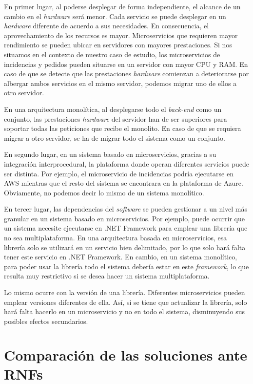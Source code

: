 \documentclass[11pt,spanish,listoffigures]{tfgetsinf}
\begin{document}
En primer lugar, al poderse desplegar de forma independiente, el alcance de un cambio en el \textit{hardware} será menor. Cada servicio se puede desplegar en un \textit{hardware} diferente de acuerdo a sus necesidades. En consecuencia, el aprovechamiento de los recursos es mayor. Microservicios que requieren mayor rendimiento se pueden ubicar en servidores con mayores prestaciones. Si nos situamos en el contexto de nuestro caso de estudio, los microservicios de incidencias y pedidos pueden situarse en un servidor con mayor CPU y RAM. En caso de que se detecte que las prestaciones \textit{hardware} comienzan a deteriorarse por albergar ambos servicios en el mismo servidor, podemos migrar uno de ellos a otro servidor. 

En una arquitectura monolítica, al desplegarse todo el \textit{back-end} como un conjunto, las prestaciones \textit{hardware} del servidor han de ser superiores para soportar todas las peticiones que recibe el monolito. En caso de que se requiera migrar a otro servidor, se ha de migrar todo el sistema como un conjunto.

En segundo lugar, en un sistema basado en microservicios, gracias a su integración interprocedural, la plataforma donde operan diferentes servicios puede ser distinta. Por ejemplo, el microservicio de incidencias podría ejecutarse en AWS mientras que el resto del sistema se encontrara en la plataforma de Azure. Obviamente, no podemos decir lo mismo de un sistema monolítico.

En tercer lugar, las dependencias del \textit{software} se pueden gestionar a un nivel más granular en un sistema basado en microservicios. Por ejemplo, puede ocurrir que un sistema necesite ejecutarse en .NET Framework para emplear una librería que no sea multiplataforma. En una arquitectura basada en microservicios, esa librería solo se utilizará en un servicio bien delimitado, por lo que solo hará falta tener este servicio en .NET Framework. En cambio, en un sistema monolítico, para poder usar la librería todo el sistema debería estar en este \textit{framework}, lo que resulta muy restrictivo si se desea hacer un sistema multiplataforma.

Lo mismo ocurre con la versión de una librería. Diferentes microservicios pueden emplear versiones diferentes de ella. Así, si se tiene que actualizar la librería, solo hará falta hacerlo en un microservicio y no en todo el sistema, disminuyendo sus posibles efectos secundarios.

\section{Comparación de las soluciones ante RNFs}
\end{document}
